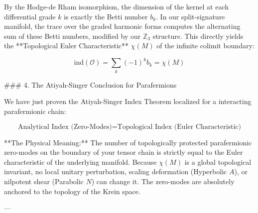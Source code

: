 By the Hodge-de Rham isomorphism, the dimension of the kernel at each differential grade $k$ is exactly the Betti number $b_k$.
In our split-signature manifold, the trace over the graded harmonic forms computes the alternating sum of these Betti numbers, modified by our $\mathbb{Z}_3$ structure. This directly yields the **Topological Euler Characteristic** $\chi(M)$ of the infinite colimit boundary:


$$\text{ind}(\mathcal{O}) = \sum_{k} (-1)^k b_k = \chi(M)$$

### 4. The Atiyah-Singer Conclusion for Parafermions

We have just proven the Atiyah-Singer Index Theorem localized for a interacting parafermionic chain:


$$\text{Analytical Index (Zero-Modes)} = \text{Topological Index (Euler Characteristic)}$$

**The Physical Meaning:**
The number of topologically protected parafermionic zero-modes on the boundary of your tensor chain is strictly equal to the Euler characteristic of the underlying manifold. Because $\chi(M)$ is a global topological invariant, no local unitary perturbation, scaling deformation (Hyperbolic $A$), or nilpotent shear (Parabolic $N$) can change it. The zero-modes are absolutely anchored to the topology of the Krein space.

---


